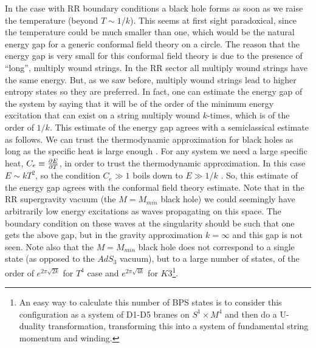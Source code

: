 In the case with RR boundary conditions a black hole forms as soon 
as we raise the temperature (beyond $T \sim 1/k$). 
This seems at first sight
paradoxical, since the temperature could be much smaller than 
one, which would be the natural energy gap for a generic
conformal field theory on a circle. The reason that the 
energy gap is very small for this conformal field theory 
is due to the presence
of ``long'', multiply wound strings. 
In the RR sector all multiply wound strings
have the same energy. But, as we saw before, multiply wound strings
lead to higher entropy states so they are preferred. In fact, one
can estimate the energy gap of the system by saying that 
it will be of the order of the minimum energy excitation that can 
exist on a string multiply wound $k$-times, which is of the order of
$1/k$. This estimate of the energy gap agrees with 
a semiclassical estimate as follows. We can trust the thermodynamic
approximation for black holes as long as the specific heat is 
large enough \cite{Preskill:1991tb}.
 For any system we need a large specific heat, $C_e \equiv
{\partial E \over \partial T}$,  in 
order to trust the thermodynamic approximation.
In this case $E \sim k T^2$, so the condition $C_e \gg1$ boils down to
$E\gg 1/k$ . So, this estimate of the energy gap agrees with the 
conformal field theory estimate. 
Note that in the RR supergravity vacuum (the $M=M_{min}$ black hole)
we could seemingly have arbitrarily low energy excitations as 
waves propagating on this space. The boundary condition on these waves
at the singularity should be such that one gets the above gap, but
in the gravity approximation $k =\infty$ and this gap is not seen. 
Note also that the $M= M_{min}$ black hole does not correspond to
a single state (as opposed to the $AdS_3$ vacuum), but to a large
number of states, of the order of $e^{ 2 \pi \sqrt{2 k} }$ for 
$T^4$ case and  $e^{ 2 \pi \sqrt{4 k} }$ for $K3$\footnote{ 
 An easy way
to calculate this number of BPS states 
is to consider this configuration as a system
of D1-D5 branes on $S^1\times M^4 $ and then do a U-duality 
transformation, transforming this into 
a system of fundamental string momentum and winding.}.

